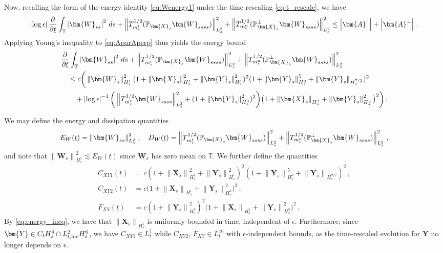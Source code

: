 \documentclass[11pt,reqno]{amsart}
\newcommand{\T}{\mathbb{T}}
\renewcommand{\P}{\mathbb{P}}
\newcommand{\X}{\bm{X}}
\newcommand{\Y}{\bm{Y}}
\newcommand{\p}{\partial}
\newcommand{\abs}[1]{\left\lvert #1 \right\rvert}
\newcommand{\norm}[1]{\left\lVert #1 \right\rVert}
\numberwithin{equation}{section}
\theoremstyle{definition}
\begin{document}
%
%
Now, recalling the form of the energy identity \eqref{eq:Wenergy1} under the time rescaling \eqref{eq:t_rescale}, we have
\begin{equation}\label{eq:Wenergy2}
\begin{aligned}
  \abs{\log\epsilon}\frac{\p}{\p \underline{t}}\int_\T\abs{\bm{W}_{ss}}^2\,ds+\norm{T_{m_\epsilon^{\rm t}}^{1/2}(\P_{\X_s}\bm{W}_{ssss})}_{L^2_s}^2  
  +\norm{T_{m_\epsilon^{\rm n}}^{1/2}(\P_{\X_s}^\perp\bm{W}_{ssss})}_{L^2_s}^2 \le \abs{\bm{A}^\parallel} +\abs{\bm{A}^\perp} \,.
\end{aligned}
\end{equation}
%
%
Applying Young's inequality to \eqref{eq:AparAperp} thus yields the energy bound 
\begin{equation}\label{eq:Wenergy3}
\begin{aligned}
  &\frac{\p}{\p \underline{t}}\int_\T\abs{\bm{W}_{ss}}^2\,ds+\norm{T_{m_\epsilon^{\rm t}}^{1/2}(\P_{\X_s}\bm{W}_{ssss})}_{L^2_s}^2  
  +\norm{T_{m_\epsilon^{\rm n}}^{1/2}(\P_{\X_s}^\perp\bm{W}_{ssss})}_{L^2_s}^2\\
  &\quad \le c\bigg(\norm{\bm{W}_s}_{H^1_s}^2(1+\norm{\X_s}_{H^1_s}^2+\norm{\Y_s}_{H^1_s}^2)^2(1+\norm{\Y_s}_{H^3_s}^5+ \norm{\Y_s}_{H^{7/2}_s})^2 \\
  &\qquad + \abs{\log\epsilon}^{-1}\bigg(\norm{T_{m_\epsilon^{\rm t}}^{1/2}\bm{W}_{ssss}}_{L^2_s}^2+ (1+\norm{\Y_s}_{H^3_s}^2)^2\bigg)\big(1+\norm{\X_s}_{H^1_s}+\norm{\Y_s}_{H^3_s}^2\big)^2\bigg)\,.
\end{aligned}
\end{equation}


We may define the energy and dissipation quantities
\begin{equation}
  E_W(\underline{t}) = \norm{\bm{W}_{ss}}_{L^2_s}^2\,, \quad 
  D_W(\underline{t}) = \norm{T_{m_\epsilon^{\rm t}}^{1/2}(\P_{\X_s}\bm{W}_{ssss})}_{L^2_s}^2  
  +\norm{T_{m_\epsilon^{\rm n}}^{1/2}(\P_{\X_s}^\perp\bm{W}_{ssss})}_{L^2_s}^2\,,
\end{equation}
and note that $\norm{\bm{W}_s}_{H^1_s}^2\lesssim E_W(\underline{t})$ since $\bm{W}_s$ has zero mean on $\T$. We further define the quantities 
\begin{equation}
\begin{aligned}
  C_{XY1}(\underline{t}) &= c(1+\norm{\X_s}_{H^1_s}^2+\norm{\Y_s}_{H^1_s}^2)^2(1+\norm{\Y_s}_{H^3_s}^5+ \norm{\Y_s}_{H^{7/2}_s})^2\,, \\
  C_{XY2}(\underline{t}) &= c\big(1+\norm{\X_s}_{H^1_s}+\norm{\Y_s}_{H^3_s}^2\big)^2\,, \\
  F_{XY}(\underline{t}) &= c(1+\norm{\Y_s}_{H^3_s}^2)^2\big(1+\norm{\X_s}_{H^1_s}+\norm{\Y_s}_{H^3_s}^2\big)^2\,.
\end{aligned}
\end{equation}
By \eqref{eq:energy_ineq}, we have that $\norm{\X_s}_{H^1_s}$ is uniformly bounded in time, independent of $\epsilon$. Furthermore, since $\Y\in C_tH^4_s\cap L^2_{t,{\rm loc}}H^6_s$, we have $C_{XY1}\in L^1_t$ while $C_{XY2}$, $F_{XY}\in L^\infty_t$ with $\epsilon$-independent bounds, as the time-rescaled evolution for $\bm{Y}$ no longer depends on $\epsilon$.
\end{document}
